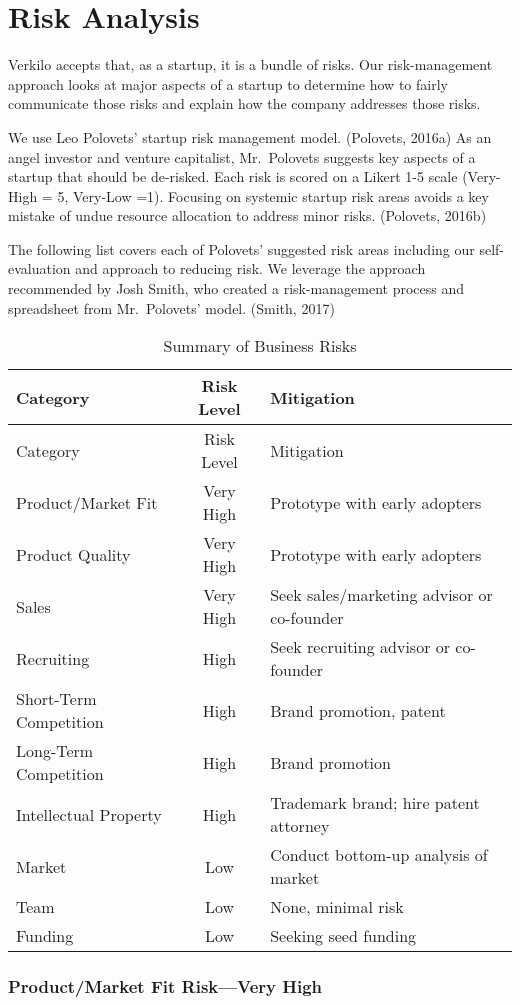 \documentclass[10pt,openany]{book}
\begin{document}
\hypertarget{risk-analysis}{%
\section{Risk Analysis}\label{risk-analysis}}

Verkilo accepts that, as a startup, it is a bundle of risks. Our
risk-management approach looks at major aspects of a startup to
determine how to fairly communicate those risks and explain how the
company addresses those risks.

We use Leo Polovets' startup risk management model. (Polovets, 2016a) As
an angel investor and venture capitalist, Mr.~Polovets suggests key
aspects of a startup that should be de-risked. Each risk is scored on a
Likert 1-5 scale (Very-High = 5, Very-Low =1). Focusing on systemic
startup risk areas avoids a key mistake of undue resource allocation to
address minor risks. (Polovets, 2016b)

The following list covers each of Polovets' suggested risk areas
including our self-evaluation and approach to reducing risk. We leverage
the approach recommended by Josh Smith, who created a risk-management
process and spreadsheet from Mr.~Polovets' model. (Smith, 2017)

\newpage

\begin{longtable}[]{@{}lcl@{}}
\caption{Summary of Business Risks}\tabularnewline
\toprule
Category & Risk Level & Mitigation\tabularnewline
\midrule
\endfirsthead
\toprule
Category & Risk Level & Mitigation\tabularnewline
\midrule
\endhead
Product/Market Fit & Very High & Prototype with early
adopters\tabularnewline
Product Quality & Very High & Prototype with early
adopters\tabularnewline
Sales & Very High & Seek sales/marketing advisor or
co-founder\tabularnewline
Recruiting & High & Seek recruiting advisor or co-founder\tabularnewline
Short-Term Competition & High & Brand promotion, patent\tabularnewline
Long-Term Competition & High & Brand promotion\tabularnewline
Intellectual Property & High & Trademark brand; hire patent
attorney\tabularnewline
Market & Low & Conduct bottom-up analysis of market\tabularnewline
Team & Low & None, minimal risk\tabularnewline
Funding & Low & Seeking seed funding\tabularnewline
\bottomrule
\end{longtable}

\hypertarget{productmarket-fit-riskvery-high}{%
\subsubsection{Product/Market Fit Risk---Very
High}\label{productmarket-fit-riskvery-high}}
\end{document}
